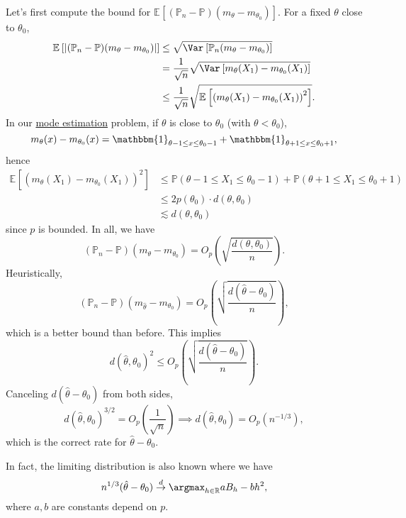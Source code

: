 Let's first compute the bound for \(\mathbb{E}_{}\left[(\mathbb{P} _n - \mathbb{P} ) (m_\theta - m_{\theta _0})\right] \). For a fixed \(\theta \) close to \(\theta _0\),
\[
	\begin{split}
		\mathbb{E}_{}\left[\vert (\mathbb{P} _n - \mathbb{P} ) (m_\theta - m_{\theta _0}) \vert \right]
		&\leq \sqrt{\Var_{}\left[\mathbb{P} _n(m_\theta - m_{\theta _0}) \right] } \\
		&= \frac{1}{\sqrt{n} } \sqrt{\Var_{}\left[m_\theta (X_1) - m_{\theta _0}(X_1) \right] } \\
		&\leq \frac{1}{\sqrt{n} } \sqrt{\mathbb{E}_{}\left[\left( m_\theta (X_1) - m_{\theta _0}(X_1) \right) ^2 \right] } .
	\end{split}
\]
In our \hyperref[prb:mode-estimation]{mode estimation} problem, if \(\theta \) is close to \(\theta _0\) (with \(\theta < \theta _0\)),
\[
	m_\theta (x) - m_{\theta _0}(x)
	= \mathbbm{1}_{\theta -1 \leq x \leq \theta _0 - 1} + \mathbbm{1}_{\theta +1 \leq x \leq \theta _0 + 1},
\]
hence
\[
	\begin{split}
		\mathbb{E}_{}\left[\left( m_\theta (X_1) - m_{\theta _0}(X_1) \right) ^2 \right]
		&\leq \mathbb{P} (\theta -1 \leq X_1 \leq \theta _0 - 1) + \mathbb{P} (\theta +1 \leq X_1 \leq \theta _0 + 1) \\
		&\leq 2 p(\theta _0) \cdot d(\theta , \theta _0) \\
		&\lesssim d(\theta , \theta _0)
	\end{split}
\]
since \(p\) is bounded. In all, we have
\[
	(\mathbb{P} _n - \mathbb{P} )(m_\theta - m_{\theta _0})
	= O_p \left( \sqrt{\frac{d(\theta , \theta _0)}{n}} \right) .
\]
Heuristically,
\[
	(\mathbb{P} _n - \mathbb{P} ) (m_{\hat{\theta} } - m_{\theta _0})
	= O_p \left( \sqrt{\frac{d(\hat{\theta} - \theta _0)}{n}} \right),
\]
which is a better bound than before. This implies
\[
	d(\hat{\theta} , \theta _0)^2
	\leq O_p \left( \sqrt{\frac{d(\hat{\theta} - \theta _0)}{n}} \right) .
\]
Canceling \(d(\hat{\theta} - \theta _0)\) from both sides,
\[
	d(\hat{\theta} , \theta _0)^{3 / 2} = O_p \left( \frac{1}{\sqrt{n} } \right)
	\implies d(\hat{\theta} , \theta _0) = O_p(n^{-1 / 3}),
\]
which is the correct rate for \(\hat{\theta} - \theta _0\).

\begin{remark}
	In fact, the limiting distribution is also known where we have
	\[
		n^{1 / 3} (\hat{\theta} - \theta _0) \overset{d}{\to } \argmax_{h\in \mathbb{R} } aB_h - b h^2,
	\]
	where \(a, b\) are constants depend on \(p\).
\end{remark}